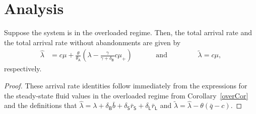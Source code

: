 \documentclass[manuscript,screen,authorversion]{acmart}
\begin{document}
\clearpage
\section{Analysis}

\begin{lemma}
Suppose the system is in the overloaded regime. Then, the total arrival rate and the total arrival rate without abandonments are given by
\begin{align}
\hat \lambda
&=
c\mu
+
\frac{\theta}{\theta_\mathsf{A}}\left(\lambda - \frac{\gamma}{\gamma + \delta_\mathsf{B}} c\mu_+\right)
\qquad\quad
\text{  and  }
\qquad\qquad
\tilde\lambda
=
c\mu
,
\end{align}
respectively.
\end{lemma}
\begin{proof}
These arrival rate identities follow immediately from the expressions for the steady-state fluid values in the overloaded regime from Corollary~\ref{overCor} and the definitions that $\hat \lambda = \lambda + \delta_\mathsf{B} \bar b + \delta_\mathsf{S} \bar r_\mathsf{S} + \delta_\mathsf{L} \bar r_\mathsf{L}$ and $\tilde \lambda = \hat \lambda - \theta(\bar q - c)$.
\end{proof}
\end{document}
